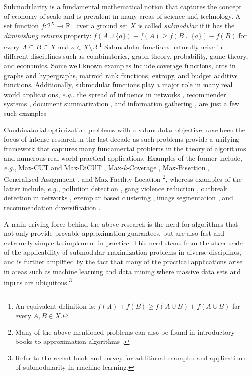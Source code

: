Submodularity is a fundamental mathematical notion that captures the concept of economy of scale and is prevalent in many areas of science and technology.
A set function $f:2^X \to \mathbb{R}_+$ over a ground set $X$ is called \emph{submodular} if it has the \emph{diminishing returns} property:
$f(A \cup \{a\}) - f(A) \geq f(B \cup \{a\}) - f(B)$ for every $A \subseteq B \subseteq X$ and $a \in X \setminus B$.\footnote{
    An equivalent definition is: $f(A) + f(B) \geq f(A \cup B) + f(A \cup B)$ for every $A,B \in X$.
}
Submodular functions naturally arise in different disciplines such as combinatorics, graph theory, probability, game theory, and economics.
Some well known examples include coverage functions, cuts in graphs and hypergraphs, matroid rank functions, entropy, and budget additive functions.
Additionally, submodular functions play a major role in many real world applications, {\em e.g.}, the spread of influence in networks \cite{KKT03,KKT05,KKT15,MR10}, recommender systems \cite{EVSG09,EG11}, document summarization \cite{DKR13,LB10,LB11}, and information gathering \cite{GKS05,KG11,KGGK06,KGGK11,KSG08}, are just a few such examples.

Combinatorial optimization problems with a submodular objective have been the focus of intense research in the last decade as such problems provide a unifying framework that captures many fundamental problems in the theory of algorithms and numerous real world practical applications.
Examples of the former include, {\em e.g.}, Max-CUT and Max-DiCUT \cite{FG95,GW95,HZ01,H01,K72,KKMO07,LLZ02,TSSW00}, Max-$k$-Coverage \cite{F98,SW11,V01}, Max-Bisection \cite{ABG13,FJ97,HZ02,Y01}, Generalized-Assignment \cite{CK05,CKR06,FGMS06,FV06}, and Max-Facility-Location \cite{AS99,CFN77a,CFN77b}\footnote{Many of the above mentioned problems can also be found in introductory books to approximation algorithms \cite{SW11,V01}.}, whereas examples of the latter include, {\em e.g.}, pollution detection \cite{KLGVF08}, gang violence reduction \cite{SSPB14}, outbreak detection in networks \cite{LKGFFVG07}, exemplar based clustering \cite{GK10}, image segmentation \cite{KXFK11}, and recommendation diversification \cite{YG11}.

A main driving force behind the above research is the need for algorithms that not only provide provable approximation guarantees, but are also fast and extremely simple to implement in practice.
This need stems from the sheer scale of the applicability of submodular maximization problems in diverse disciplines, and is further amplified by the fact that many of the practical applications arise in areas such as machine learning and data mining where massive data sets and inputs are ubiquitous.\footnote{Refer to the recent book \cite{B13} and survey \cite{KG14} for additional examples and applications of submodularity in machine learning.}


